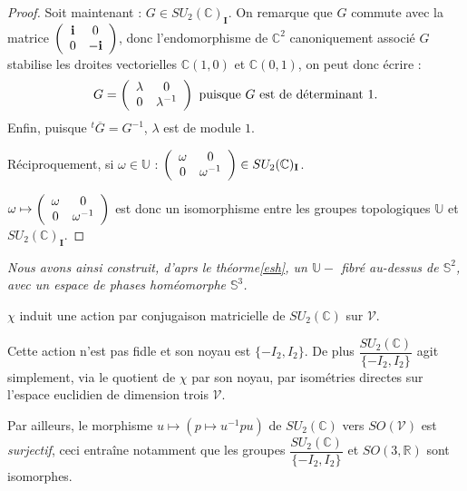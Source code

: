 \begin{proof}
\par
Soit maintenant : $G\in SU_2(\mathbb{C})_{\mathbf{I}}$. %
On remarque que $G$ commute avec la matrice $\left(\begin{array}{cc}\mathbf{i}&0\\0&-\mathbf{i}\end{array}\right)$, %
donc l'endomorphisme de $\mathbb{C}^2$ canoniquement associ\'e  $G$ stabilise les droites vectorielles $\mathbb{C}(1,0)$ et $\mathbb{C}(0,1)$, %
on peut donc \'ecrire :
\[G=\left(\begin{array}{cc}\lambda&0\\0&\lambda^{-1}\end{array}\right)\text{ puisque $G$ est de d\'eterminant $1$.}\]
Enfin, puisque $^t\overline{G}=G^{-1}$, $\lambda$ est de module $1$.

\par
R\'eciproquement, si $\omega\in\mathbb{U}$ : $\left(\begin{array}{cc}\omega&0\\0&\omega^{-1}\end{array}\right)\in SU_2(\mathbb{C})_{\mathbf{I}}$.

\par
$\omega\mapsto\left(\begin{array}{cc}\omega&0\\0&\omega^{-1}\end{array}\right)$ est donc un isomorphisme entre les groupes topologiques $\mathbb{U}$ et $SU_2(\mathbb{C})_{\mathbf{I}}$.
\end{proof}

\etoile
\emph{Nous avons ainsi construit, d'aprs le th\'eorme\ref{esh}, un $\mathbb{U}-$ fibr\'e au-dessus de $\mathbb{S}^2$, %
avec un espace de phases hom\'eomorphe  $\mathbb{S}^3$.}

\begin{rema}
$\chi$ induit une action par conjugaison matricielle de $SU_2(\mathbb{C})$ sur $\mathcal{V}$.
\par
Cette action n'est pas fidle et son noyau est $\{-I_2,I_2\}$. %
De plus $\dfrac{SU_2(\mathbb{C})}{\{-I_2,I_2\}}$ agit simplement, via le quotient de $\chi$ par son noyau, %
par isom\'etries directes sur l'espace euclidien de dimension trois $\mathcal{V}$.

\par
Par ailleurs, le morphisme $u\mapsto \left(p\mapsto u^{-1}pu\right)$ de $SU_2(\mathbb{C})$ vers $SO(\mathcal{V})$ est \emph{surjectif}, %
ceci entra\^ine notamment que les groupes $\dfrac{SU_2(\mathbb{C})}{\{-I_2,I_2\}}$ et $SO(3,\mathbb{R})$ sont isomorphes.
\end{rema}

\begin{comment}
\etoile
D\'ecliner la d\'emonstration du th\'eor\g{e}me\ref{esh} au cas particulier de $\mathbb{S}^3\twoheadrightarrow\dfrac{\mathbb{S}^3}{\mathbb{S}^3_{\mathbf{I}}}$ %
pour construire explicitement un syst\g{e}me de trivialisations.

\par
Formule explicite pour une section ? Interpr\'etation g\'eom\'etrique ?
\end{comment}

